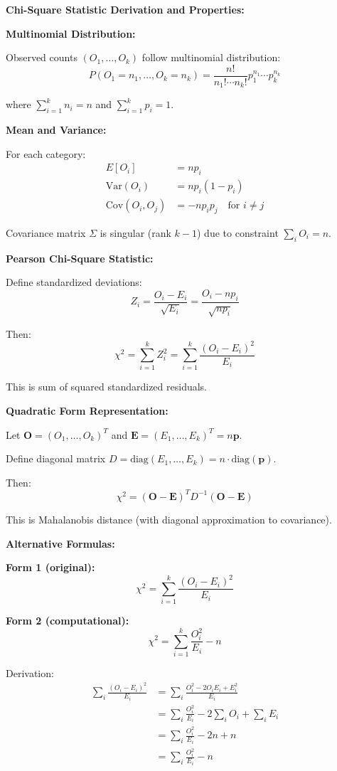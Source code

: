 \documentclass[12pt]{article}
\begin{document}
\begin{explanation}

\textbf{Chi-Square Statistic Derivation and Properties:}

\textbf{Multinomial Distribution:}

Observed counts $(O_1, \ldots, O_k)$ follow multinomial distribution:
\[
P(O_1 = n_1, \ldots, O_k = n_k) = \frac{n!}{n_1! \cdots n_k!}p_1^{n_1} \cdots p_k^{n_k}
\]

where $\sum_{i=1}^k n_i = n$ and $\sum_{i=1}^k p_i = 1$.

\textbf{Mean and Variance:}

For each category:
\begin{align*}
E[O_i] &= np_i \\
\text{Var}(O_i) &= np_i(1 - p_i) \\
\text{Cov}(O_i, O_j) &= -np_ip_j \quad \text{for } i \neq j
\end{align*}

Covariance matrix $\Sigma$ is singular (rank $k-1$) due to constraint $\sum_i O_i = n$.

\textbf{Pearson Chi-Square Statistic:}

Define standardized deviations:
\[
Z_i = \frac{O_i - E_i}{\sqrt{E_i}} = \frac{O_i - np_i}{\sqrt{np_i}}
\]

Then:
\[
\chi^2 = \sum_{i=1}^k Z_i^2 = \sum_{i=1}^k \frac{(O_i - E_i)^2}{E_i}
\]

This is sum of squared standardized residuals.

\textbf{Quadratic Form Representation:}

Let $\mathbf{O} = (O_1, \ldots, O_k)^T$ and $\mathbf{E} = (E_1, \ldots, E_k)^T = n\mathbf{p}$.

Define diagonal matrix $D = \text{diag}(E_1, \ldots, E_k) = n \cdot \text{diag}(\mathbf{p})$.

Then:
\[
\chi^2 = (\mathbf{O} - \mathbf{E})^T D^{-1} (\mathbf{O} - \mathbf{E})
\]

This is Mahalanobis distance (with diagonal approximation to covariance).

\textbf{Alternative Formulas:}

\textbf{Form 1 (original):}
\[
\chi^2 = \sum_{i=1}^k \frac{(O_i - E_i)^2}{E_i}
\]

\textbf{Form 2 (computational):}
\[
\chi^2 = \sum_{i=1}^k \frac{O_i^2}{E_i} - n
\]

Derivation:
\begin{align*}
\sum_i \frac{(O_i - E_i)^2}{E_i} &= \sum_i \frac{O_i^2 - 2O_iE_i + E_i^2}{E_i} \\
&= \sum_i \frac{O_i^2}{E_i} - 2\sum_i O_i + \sum_i E_i \\
&= \sum_i \frac{O_i^2}{E_i} - 2n + n \\
&= \sum_i \frac{O_i^2}{E_i} - n
\end{align*}


\end{explanation}
\end{document}
